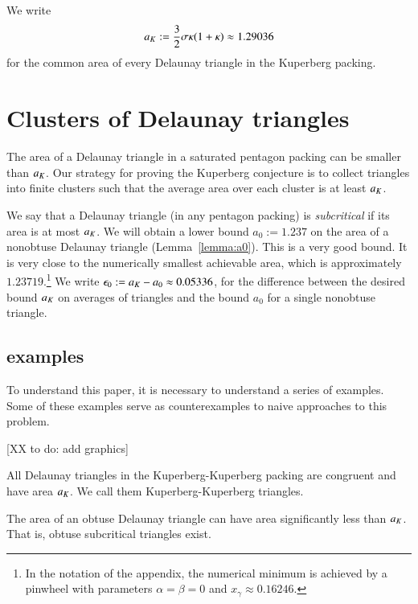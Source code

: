 We write 
\[
a_K := \frac{3}{2}{ \sigma \kappa(1+\kappa)} \approx 1.29036
\] %
for the common area of every Delaunay triangle in the 
Kuperberg packing.  

\section{Clusters of Delaunay triangles}

The area of a Delaunay triangle in a saturated pentagon packing can be
smaller than $a_K$.  Our strategy for proving the Kuperberg conjecture
is to collect triangles into finite clusters such that the average
area over each cluster is at least $a_K$.  

We say that a Delaunay triangle (in any pentagon packing) is {\it
  subcritical} if its area is at most $a_K$.  We will obtain a lower
bound $a_0 := 1.237$ on the area of a nonobtuse Delaunay triangle
(Lemma~\ref{lemma:a0}).  This is a very good bound.  It is very close
to the numerically smallest achievable area, which is approximately
$1.23719$.\footnote{In the notation of the appendix, the numerical 
minimum is achieved by a pinwheel with parameters $\alpha=\beta=0$
and $x_\gamma\approx 0.16246$.}  
We write $\epsilon_0 := a_K - a_0 \approx 0.05336$, for the
difference between the desired bound $a_K$ on averages of triangles
and the bound $a_0$ for a single nonobtuse triangle.

\subsection{examples}

To understand this paper, it is necessary to understand a series of examples.
Some of these examples serve as counterexamples to naive approaches to this problem.

[XX to do: add graphics]

\begin{example} All Delaunay triangles in the Kuperberg-Kuperberg packing are congruent and have
area $a_K$.
We call them Kuperberg-Kuperberg triangles.
\end{example}

\begin{example}  The area of an obtuse Delaunay triangle can have area
significantly less than $a_K$.  That is, obtuse subcritical triangles exist.
\end{example}

